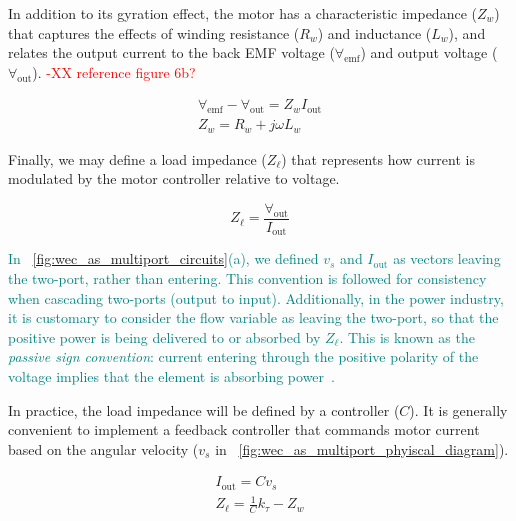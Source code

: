 \documentclass[lettersize,journal]{IEEEtran}
\newcommand{\rc}[1]{\textcolor{red}{#1}}
\newcommand{\ak}[1]{\textcolor{teal}{#1}}
\begin{document}
\noindent{}In addition to its gyration effect, the motor has a characteristic impedance ($Z_w$) that captures the effects of winding resistance ($R_w$) and inductance ($L_w$), and relates the output current to the back EMF voltage ($\forall_{\textrm{emf}}$) and output voltage ($\forall_{\textrm{out}}$).  \rc{-XX reference figure 6b?}

\begin{subequations}
        \begin{gather}
                \forall_{\textrm{emf}} - \forall_{\textrm{out}} = Z_w I_{\textrm{out}}\\
                Z_w = R_w + j \omega L_w \label{eq:winding_impedance}
        \end{gather}
\end{subequations}

Finally, we may define a load impedance ($Z_\ell$) that represents how current is modulated by the motor controller relative to voltage.

\begin{equation}
        Z_\ell = \frac{\forall_{\textrm{out}}}{I_{\textrm{out}}}
        \label{eq:load_impedance}
\end{equation}

\ak{In \figurename~\ref{fig:wec_as_multiport_circuits}(a), we defined $v_s$ and $I_{\textrm{out}}$ as vectors leaving the two-port, rather than entering. 
This convention is followed for consistency when cascading two-ports (output to input). 
Additionally, in the power industry, it is customary to consider the flow variable as leaving the two-port, so that the positive power is being delivered to or absorbed by $Z_\ell$. 
This is known as the \textit{passive sign convention}: current entering through the positive polarity of the voltage implies that the element is absorbing power~\cite{CircuitFundamental}.}

\noindent{}In practice, the load impedance will be defined by a controller ($C$).
It is generally convenient to implement a feedback controller that commands motor current based on the angular velocity ($v_s$ in \figurename~\ref{fig:wec_as_multiport_phyiscal_diagram}).

\begin{subequations}
\begin{gather}
        I_{\textrm{out}} = C v_s \\  
        Z_\ell = \frac{1}{C} k_\tau - Z_w     
\end{gather}
\end{subequations}
\end{document}
